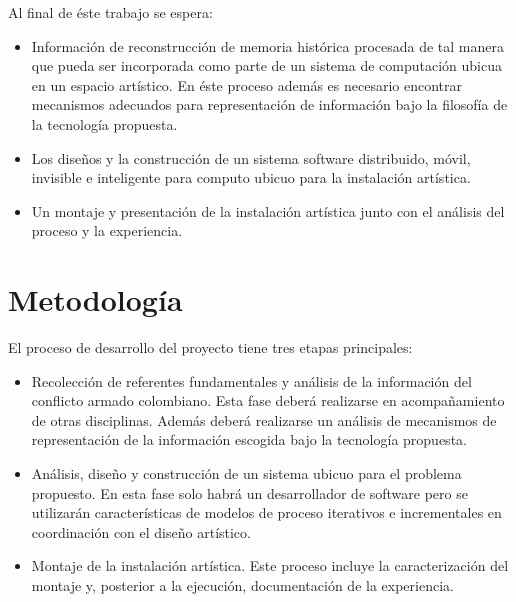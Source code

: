 Al final de éste trabajo se espera:

\begin{itemize}
\item Información de reconstrucción de memoria histórica procesada de tal manera que pueda ser incorporada como parte de un sistema de computación ubicua en un espacio artístico. En éste proceso además es necesario encontrar mecanismos adecuados para representación de información bajo la filosofía de la tecnología propuesta.  
\item Los diseños y la construcción de un sistema software distribuido, móvil, invisible e inteligente para computo ubicuo para la instalación artística.
\item Un montaje y presentación de la instalación artística junto con el análisis del proceso y la experiencia. 
\end{itemize}

\section{Metodología}

El proceso de desarrollo del proyecto tiene tres etapas principales:
\begin{itemize}
    \item Recolección de referentes fundamentales y análisis de la información del conflicto armado colombiano. Esta fase deberá realizarse en acompañamiento de otras disciplinas. Además deberá realizarse un análisis de mecanismos de representación de la información escogida bajo la tecnología propuesta.
    
    \item Análisis, diseño y construcción de un sistema ubicuo para el problema propuesto. En esta fase solo habrá un desarrollador de software pero se utilizarán características de modelos de proceso iterativos e incrementales en coordinación con el diseño artístico.
    \item Montaje de la instalación artística. Este proceso incluye la caracterización del montaje y, posterior a la ejecución, documentación de la experiencia.
\end{itemize}

